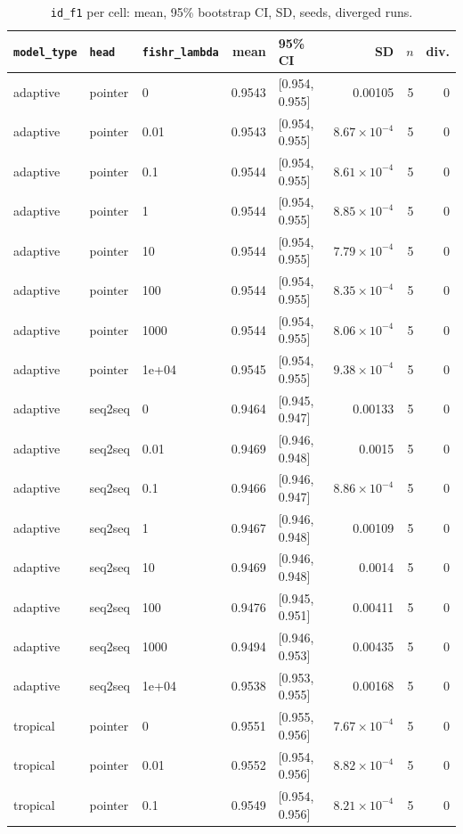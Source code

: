 \documentclass[10pt]{article}
\begin{document}
{\small
\begin{longtable}{lllrlrrr}
\caption{\texttt{id\_f1} per cell: mean, 95\% bootstrap CI, SD, seeds, diverged runs.}\label{tab:summary-id_f1}\\
\toprule
\texttt{model\_type} & \texttt{head} & \texttt{fishr\_lambda} & mean & 95\% CI & SD & $n$ & div.\\
\midrule
\endhead
adaptive & pointer & 0 & 0.9543 & [0.954, 0.955] & 0.00105 & 5 & 0\\
adaptive & pointer & 0.01 & 0.9543 & [0.954, 0.955] & $8.67\times10^{-4}$ & 5 & 0\\
adaptive & pointer & 0.1 & 0.9544 & [0.954, 0.955] & $8.61\times10^{-4}$ & 5 & 0\\
adaptive & pointer & 1 & 0.9544 & [0.954, 0.955] & $8.85\times10^{-4}$ & 5 & 0\\
adaptive & pointer & 10 & 0.9544 & [0.954, 0.955] & $7.79\times10^{-4}$ & 5 & 0\\
adaptive & pointer & 100 & 0.9544 & [0.954, 0.955] & $8.35\times10^{-4}$ & 5 & 0\\
adaptive & pointer & 1000 & 0.9544 & [0.954, 0.955] & $8.06\times10^{-4}$ & 5 & 0\\
adaptive & pointer & 1e+04 & 0.9545 & [0.954, 0.955] & $9.38\times10^{-4}$ & 5 & 0\\
adaptive & seq2seq & 0 & 0.9464 & [0.945, 0.947] & 0.00133 & 5 & 0\\
adaptive & seq2seq & 0.01 & 0.9469 & [0.946, 0.948] & 0.0015 & 5 & 0\\
adaptive & seq2seq & 0.1 & 0.9466 & [0.946, 0.947] & $8.86\times10^{-4}$ & 5 & 0\\
adaptive & seq2seq & 1 & 0.9467 & [0.946, 0.948] & 0.00109 & 5 & 0\\
adaptive & seq2seq & 10 & 0.9469 & [0.946, 0.948] & 0.0014 & 5 & 0\\
adaptive & seq2seq & 100 & 0.9476 & [0.945, 0.951] & 0.00411 & 5 & 0\\
adaptive & seq2seq & 1000 & 0.9494 & [0.946, 0.953] & 0.00435 & 5 & 0\\
adaptive & seq2seq & 1e+04 & 0.9538 & [0.953, 0.955] & 0.00168 & 5 & 0\\
tropical & pointer & 0 & 0.9551 & [0.955, 0.956] & $7.67\times10^{-4}$ & 5 & 0\\
tropical & pointer & 0.01 & 0.9552 & [0.954, 0.956] & $8.82\times10^{-4}$ & 5 & 0\\
tropical & pointer & 0.1 & 0.9549 & [0.954, 0.956] & $8.21\times10^{-4}$ & 5 & 0\\

\end{longtable}}
\end{document}

